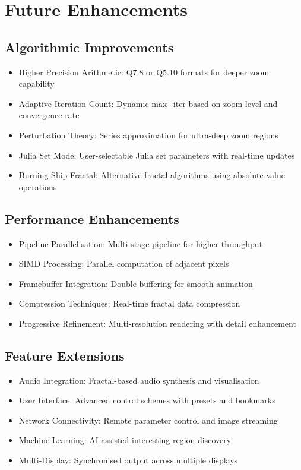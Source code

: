 \documentclass[11pt,a4paper]{article}
\begin{document}
\section{Future Enhancements}

\subsection{Algorithmic Improvements}
\begin{itemize}
\item Higher Precision Arithmetic: Q7.8 or Q5.10 formats for deeper zoom capability
\item Adaptive Iteration Count: Dynamic max\_iter based on zoom level and convergence rate
\item Perturbation Theory: Series approximation for ultra-deep zoom regions
\item Julia Set Mode: User-selectable Julia set parameters with real-time updates
\item Burning Ship Fractal: Alternative fractal algorithms using absolute value operations
\end{itemize}

\subsection{Performance Enhancements}
\begin{itemize}
\item Pipeline Parallelisation: Multi-stage pipeline for higher throughput
\item SIMD Processing: Parallel computation of adjacent pixels
\item Framebuffer Integration: Double buffering for smooth animation
\item Compression Techniques: Real-time fractal data compression
\item Progressive Refinement: Multi-resolution rendering with detail enhancement
\end{itemize}

\subsection{Feature Extensions}
\begin{itemize}
\item Audio Integration: Fractal-based audio synthesis and visualisation
\item User Interface: Advanced control schemes with presets and bookmarks
\item Network Connectivity: Remote parameter control and image streaming
\item Machine Learning: AI-assisted interesting region discovery
\item Multi-Display: Synchronised output across multiple displays
\end{itemize}
\end{document}
